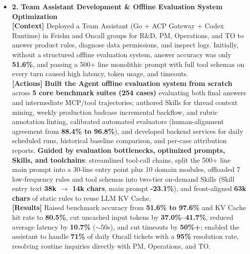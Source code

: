 \documentclass[10pt,letterpaper]{article}
\begin{document}
\begin{itemize}[leftmargin=0pt,label={}]
\begin{itemize}[leftmargin=10pt,label=$\circ$,itemsep=2.5pt,topsep=1.5pt]
    \item \textbf{2. Team Assistant Development \& Offline Evaluation System Optimization} \\
    \textbf{[Context]} Deployed a Team Assistant (Go + ACP Gateway + Codex Runtime) in Feishu and Oncall groups for R\&D, PM, Operations, and TO to answer product rules, diagnose data permissions, and inspect logs. Initially, without a structured offline evaluation system, answer accuracy was only \textbf{51.6\%}, and passing a 500+ line monolithic prompt with full tool schemas on every turn caused high latency, token usage, and timeouts. \\
    \textbf{[Actions]} \textbf{Built the Agent offline evaluation system from scratch} across \textbf{5 core benchmark suites (254 cases)} evaluating both final answers and intermediate MCP/tool trajectories; authored Skills for thread context mining, weekly production badcase incremental backflow, and rubric annotation linting, calibrated automated evaluators (human-alignment agreement from \textbf{88.4\% to 96.8\%}), and developed backend services for daily scheduled runs, historical baseline comparison, and per-case attribution reports. \textbf{Guided by evaluation bottlenecks, optimized prompts, Skills, and toolchains}: streamlined tool-call chains, split the 500+ line main prompt into a 30-line entry point plus 10 domain modules, offloaded 7 low-frequency rules and tool schemas into two-tier on-demand Skills (Skill entry text \textbf{38k $\rightarrow$ 14k chars}, main prompt \textbf{-23.1\%}), and front-aligned \textbf{63k chars} of static rules to reuse LLM KV Cache. \\
    \textbf{[Results]} Raised benchmark accuracy from \textbf{51.6\% to 97.6\%} and KV Cache hit rate to \textbf{80.5\%}, cut uncached input tokens by \textbf{37.0\%--41.7\%}, reduced average latency by \textbf{10.7\%} ($\sim$50s), and cut timeouts by \textbf{50\%+}; enabled the assistant to handle \textbf{71\%} of daily Oncall tickets with a \textbf{95\%} resolution rate, resolving routine inquiries directly with PM, Operations, and TO.
  \end{itemize}


\end{itemize}
\end{document}
